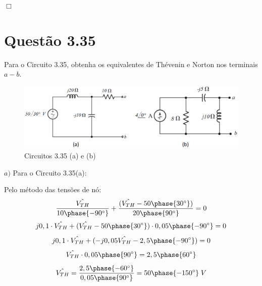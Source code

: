 \documentclass[
	12pt,				%
	oneside,			%
	a4paper,			%
	english,			%
	french,				%
	spanish,			%
	brazil				%
	]{abntex2}
\begin{document}
\begin{flushright}
    $\Box$
\end{flushright}
\newpage


\section*{Questão 3.35}
Para o Circuito 3.35, obtenha os equivalentes de Thévenin e Norton nos terminais $a-b$.
\begin{figure}[htb]
	\centering
	\includegraphics[scale=0.5]{3-35.PNG}
	\caption{Circuitos 3.35 (a) e (b)}
\end{figure}

$a)$ Para o Circuito 3.35(a):

Pelo método das tensões de nó:
$$\dfrac{\hat{V_{TH}}}{10\phase{-90^{\circ}}}+\dfrac{(\hat{V_{TH}}-50\phase{30^{\circ}})}{20\phase{90^{\circ}}}=0$$
$$j0,1\cdot \hat{V_{TH}} + (\hat{V_{TH}} - 50\phase{30^{\circ}}) \cdot 0,05\phase{-90^{\circ}} = 0$$
$$j0,1\cdot \hat{V_{TH}} + (-j0,05\hat{V_{TH}} - 2,5\phase{-90^{\circ}}) = 0$$
$$\hat{V_{TH}}\cdot 0,05\phase{90^{\circ}}=2,5\phase{60^{\circ}}$$
$$\hat{V_{TH}}=\dfrac{2,5\phase{-60^{\circ}}}{0,05\phase{90^{\circ}}} = 50\phase{-150^{\circ}}\;V$$
\end{document}
